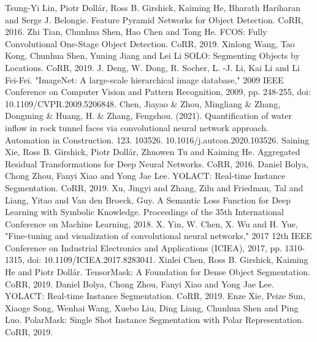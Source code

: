 \documentclass[10pt,twocolumn,letterpaper]{article}
\begin{document}
\begin{thebibliography}{1}
Tsung-Yi Lin, Piotr Doll\'ar, Ross B. Girshick, Kaiming He, Bharath Hariharan and Serge J. Belongie.
Feature Pyramid Networks for Object Detection. CoRR, 2016.
Zhi Tian, Chunhua Shen, Hao Chen and Tong He.
FCOS: Fully Convolutional One-Stage Object Detection. CoRR, 2019.
Xinlong Wang, Tao Kong, Chunhua Shen, Yuning Jiang and Lei Li
SOLO: Segmenting Objects by Locations. CoRR, 2019.
J. Deng, W. Dong, R. Socher, L. -J. Li, Kai Li and Li Fei-Fei.
"ImageNet: A large-scale hierarchical image database," 2009 IEEE Conference on Computer Vision and Pattern Recognition, 2009, pp. 248-255, doi: 10.1109/CVPR.2009.5206848.
Chen, Jiayao \& Zhou, Mingliang \& Zhang, Dongming \& Huang, H. \& Zhang, Fengshou. (2021).
Quantification of water inflow in rock tunnel faces via convolutional neural network approach. Automation in Construction. 123. 103526. 10.1016/j.autcon.2020.103526. 
Saining Xie, Ross B. Girshick, Piotr Doll\'ar, Zhuowen Tu and Kaiming He.
Aggregated Residual Transformations for Deep Neural Networks. CoRR, 2016.
Daniel Bolya, Chong Zhou, Fanyi Xiao and Yong Jae Lee.
YOLACT: Real-time Instance Segmentation. CoRR, 2019.
Xu, Jingyi and Zhang, Zilu and Friedman, Tal and Liang, Yitao and Van den Broeck, Guy.
A Semantic Loss Function for Deep Learning with Symbolic Knowledge. Proceedings of the 35th International Conference on Machine Learning, 2018.
X. Yin, W. Chen, X. Wu and H. Yue, "Fine-tuning and visualization of convolutional neural networks," 2017 12th IEEE Conference on Industrial Electronics and Applications (ICIEA), 2017, pp. 1310-1315, doi: 10.1109/ICIEA.2017.8283041.
Xinlei Chen, Ross B. Girshick, Kaiming He and Piotr Doll\'ar.
TensorMask: A Foundation for Dense Object Segmentation. CoRR, 2019.
Daniel Bolya, Chong Zhou, Fanyi Xiao and Yong Jae Lee.
YOLACT: Real-time Instance Segmentation. CoRR, 2019.
Enze Xie, Peize Sun, Xiaoge Song, Wenhai Wang, Xuebo Liu, Ding Liang, Chunhua Shen and Ping Luo.
PolarMask: Single Shot Instance Segmentation with Polar Representation. CoRR, 2019.

\end{thebibliography}
\end{document}
